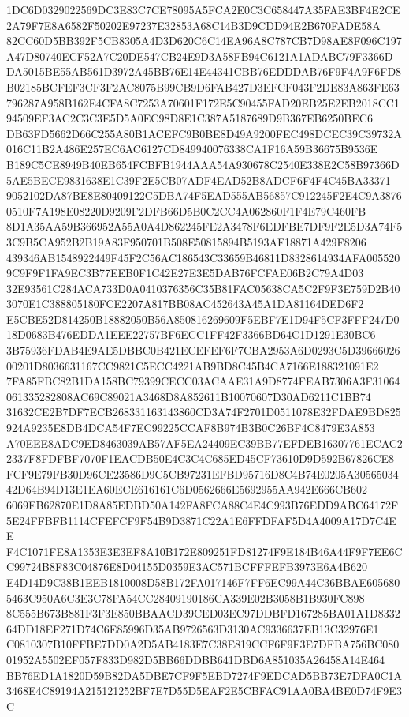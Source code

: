 \documentclass[UTF8,fontset=fandol,zihao=-4,a4paper]{ctexart}
\begin{document}
{{1DC6D0329022569DC3E83C7CE78095A5FCA2E0C3C658447A35FAE3BF4E2CE2A79F7E8A6582F50202E97237E32853A68C14B3D9CDD94E2B670FADE58A
82CC60D5BB392F5CB8305A4D3D620C6C14EA96A8C787CB7D98AE8F096C197A47D80740ECF52A7C20DE547CB24E9D3A58FB94C6121A1ADABC79F3366D
DA5015BE55AB561D3972A45BB76E14E44341CBB76EDDDAB76F9F4A9F6FD8B02185BCFEF3CF3F2AC8075B99CB9D6FAB427D3EFCF043F2DE83A863FE63
796287A958B162E4CFA8C7253A70601F172E5C90455FAD20EB25E2EB2018CC194509EF3AC2C3C3E5D5A0EC98D8E1C387A5187689D9B367EB6250BEC6
DB63FD5662D66C255A80B1ACEFC9B0BE8D49A9200FEC498DCEC39C39732A016C11B2A486E257EC6AC6127CD849940076338CA1F16A59B36675B9536E
B189C5CE8949B40EB654FCBFB1944AAA54A930678C2540E338E2C58B97366D5AE5BECE9831638E1C39F2E5CB07ADF4EAD52B8ADCF6F4F4C45BA33371
9052102DA87BE8E80409122C5DBA74F5EAD555AB56857C912245F2E4C9A38760510F7A198E08220D9209F2DFB66D5B0C2CC4A062860F1F4E79C460FB
8D1A35AA59B366952A55A0A4D862245FE2A3478F6EDFBE7DF9F2E5D3A74F53C9B5CA952B2B19A83F950701B508E50815894B5193AF18871A429F8206
439346AB1548922449F45F2C56AC186543C33659B46811D8328614934AFA0055209C9F9F1FA9EC3B77EEB0F1C42E27E3E5DAB76FCFAE06B2C79A4D03
32E93561C284ACA733D0A0410376356C35B81FAC05638CA5C2F9F3E759D2B403070E1C388805180FCE2207A817BB08AC452643A45A1DA81164DED6F2
E5CBE52D814250B18882050B56A850816269609F5EBF7E1D94F5CF3FFF247D018D0683B476EDDA1EEE22757BF6ECC1FF42F3366BD64C1D1291E30BC6
3B75936FDAB4E9AE5DBBC0B421ECEFEF6F7CBA2953A6D0293C5D3966602600201D8036631167CC9821C5ECC4221AB9BD8C45B4CA7166E188321091E2
7FA85FBC82B1DA158BC79399CECC03ACAAE31A9D8774FEAB7306A3F31064061335282808AC69C89021A3468D8A852611B10070607D30AD6211C1BB74
31632CE2B7DF7ECB268331163143860CD3A74F2701D0511078E32FDAE9BD825924A9235E8DB4DCA54F7EC99225CCAF8B974B3B0C26BF4C8479E3A853
A70EEE8ADC9ED8463039AB57AF5EA24409EC39BB77EFDEB16307761ECAC22337F8FDFBF7070F1EACDB50E4C3C4C685ED45CF73610D9D592B67826CE8
FCF9E79FB30D96CE23586D9C5CB97231EFBD95716D8C4B74E0205A3056503442D64B94D13E1EA60ECE616161C6D0562666E5692955AA942E666CB602
6069EB62870E1D8A85EDBD50A142FA8FCA88C4E4C993B76EDD9ABC64172F5E24FFBFB1114CFEFCF9F54B9D3871C22A1E6FFDFAF5D4A4009A17D7C4EE
F4C1071FE8A1353E3E3EF8A10B172E809251FD81274F9E184B46A44F9F7EE6CC99724B8F83C04876E8D04155D0359E3AC571BCFFFEFB3973E6A4B620
E4D14D9C38B1EEB1810008D58B172FA017146F7FF6EC99A44C36BBAE6056805463C950A6C3E3C78FA54CC28409190186CA339E02B3058B1B930FC898
8C555B673B881F3F3E850BBAACD39CED03EC97DDBFD167285BA01A1D833264DD18EF271D74C6E85996D35AB9726563D3130AC9336637EB13C32976E1
C0810307B10FFBE7DD0A2D5AB4183E7C38E819CCF6F9F3E7DFBA756BC08001952A5502EF057F833D982D5BB66DDBB641DBD6A851035A26458A14E464
BB76ED1A1820D59B82DA5DBE7CF9F5EBD7274F9EDCAD5BB73E7DFA0C1A3468E4C89194A215121252BF7E7D55D5EAF2E5CBFAC91AA0BA4BE0D74F9E3C
}}
\end{document}
